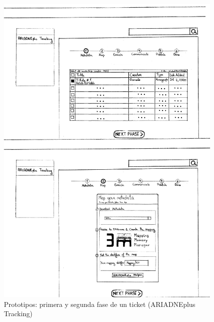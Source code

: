 \documentclass[
]{article}
\begin{document}
\begin{figure}
\hypertarget{phase-1-2-prototipe}{%
\centering
\includegraphics{../_static/images/phase-1-2-prototipe.png}
\caption{Prototipos: primera y segunda fase de un ticket (ARIADNEplus
Tracking)}\label{phase-1-2-prototipe}
}
\end{figure}
\end{document}
